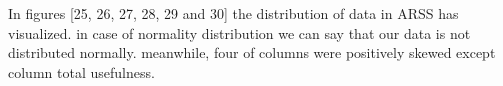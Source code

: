 \documentclass[letterpaper, 10 pt, conference]{ieeeconf}
\begin{document}
\begin{figure}[!ht]
\end{figure}


In figures [25, 26, 27, 28, 29 and 30] the distribution of data in ARSS has visualized. in case of normality distribution we can say that our data is not distributed normally. meanwhile, four of columns were positively skewed except column total usefulness.
\end{document}
